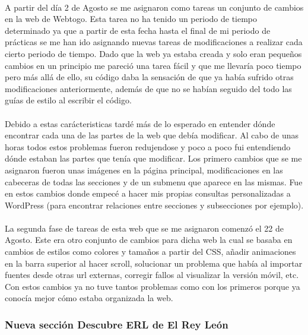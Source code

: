 \documentclass[10pt, a4paper,spanish]{article}
\begin{document}
                \paragraph{}
                A partir del día 2 de Agosto se me asignaron como tareas un conjunto de cambios en la web de Webtogo. Esta tarea no ha tenido un periodo de tiempo determinado ya que a partir de esta fecha hasta el final de mi periodo de prácticas se me han ido asignando nuevas tareas de modificaciones a realizar cada cierto periodo de tiempo. Dado que la web ya estaba creada y solo eran pequeños cambios en un principio me pareció una tarea fácil y que me llevaría poco tiempo pero más allá de ello, su código daba la sensación de que ya había sufrido otras modificaciones anteriormente, además de que no se habían seguido del todo las guías de estilo al escribir el código.

                \paragraph{}
                Debido a estas carácteristicas tardé más de lo esperado en entender dónde encontrar cada una de las partes de la web que debía modificar. Al cabo de unas horas todos estos problemas fueron redujendose y poco a poco fui entendiendo dónde estaban las partes que tenía que modificar. Los primero cambios que se me asignaron fueron unas imágenes en la página principal, modificaciones en las cabeceras de todas las secciones y de un submenu que aparece en las mismas. Fue en estos cambios donde empecé a hacer mis propias consultas personalizadas a WordPress (para encontrar relaciones entre secciones y subsecciones por ejemplo).

                \paragraph{}
                La segunda fase de tareas de esta web que se me asignaron comenzó el 22 de Agosto. Este era otro conjunto de cambios para dicha web la cual se basaba en cambios de estilos como colores y tamaños a partir del CSS, añadir animaciones en la barra superior al hacer scroll, solucionar un problema que había al importar fuentes desde otras url externas, corregir fallos al visualizar la versión móvil, etc. Con estos cambios ya no tuve tantos problemas como con los primeros porque ya conocía mejor cómo estaba organizada la web.


            \subsubsection{Nueva sección Descubre ERL de El Rey León}
\end{document}
